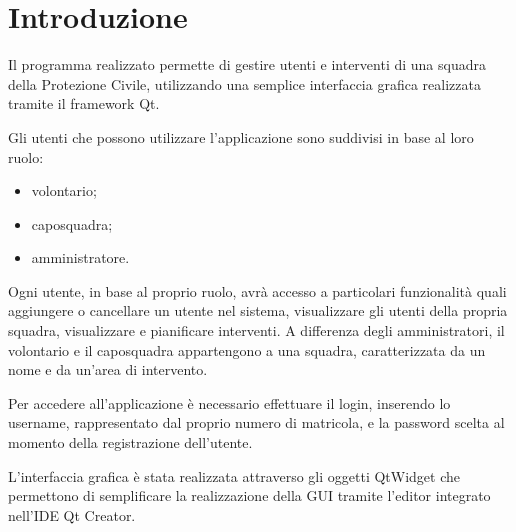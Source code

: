 \section{Introduzione}
Il programma realizzato permette di gestire utenti e interventi di una squadra della Protezione Civile, utilizzando una semplice interfaccia grafica realizzata tramite il framework Qt.

Gli utenti che possono utilizzare l'applicazione sono suddivisi in base al loro ruolo:
\begin{itemize}
	\item volontario;
	\item caposquadra;
	\item amministratore.
\end{itemize}
Ogni utente, in base al proprio ruolo, avrà accesso a particolari funzionalità quali aggiungere o cancellare un utente nel sistema, visualizzare gli utenti della propria squadra, visualizzare e pianificare interventi. A differenza degli amministratori, il volontario e il caposquadra appartengono a una squadra, caratterizzata da un nome e da un'area di intervento. 

Per accedere all'applicazione è necessario effettuare il login, inserendo lo username, rappresentato dal proprio numero di matricola, e la password scelta al momento della registrazione dell'utente.

L'interfaccia grafica è stata realizzata attraverso gli oggetti QtWidget che permettono di semplificare la realizzazione della GUI tramite l'editor integrato nell'IDE Qt Creator.

